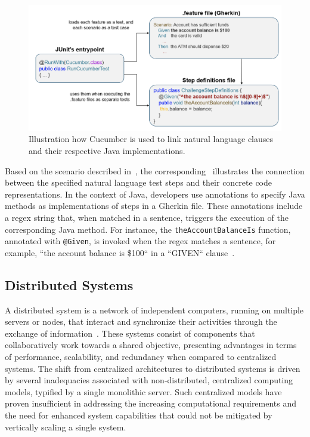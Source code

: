 \begin{figure}
    \centering
    \includegraphics[width=\linewidth]{files/figures/cucumber_test_step_mapping.png}
    \caption{Illustration how Cucumber is used to link natural language clauses and their respective Java implementations.}
    \label{fig:cucumber-mapping}
\end{figure}

Based on the scenario described in~, the corresponding~ illustrates the connection between the specified natural language test steps and their concrete code representations. In the context of Java, developers use annotations to specify Java methods as implementations of steps in a Gherkin file. These annotations include a regex string that, when matched in a sentence, triggers the execution of the corresponding Java method. For instance, the \texttt{theAccountBalanceIs} function, annotated with \texttt{@Given}, is invoked when the regex matches a sentence, for example, ``the account balance is \$100`` in a ``GIVEN`` clause~\cite{noauthor_bdd_nodate}.

\subsection{Distributed Systems}
\label{subsec:dissys}
A distributed system is a network of independent computers, running on multiple servers or nodes, that interact and synchronize their activities through the exchange of information~\cite{tanenbaum2007distributed}. These systems consist of components that collaboratively work towards a shared objective, presenting advantages in terms of performance, scalability, and redundancy when compared to centralized systems. The shift from centralized architectures to distributed systems is driven by several inadequacies associated with non-distributed, centralized computing models, typified by a single monolithic server. Such centralized models have proven insufficient in addressing the increasing computational requirements and the need for enhanced system capabilities that could not be mitigated by vertically scaling a single system.

